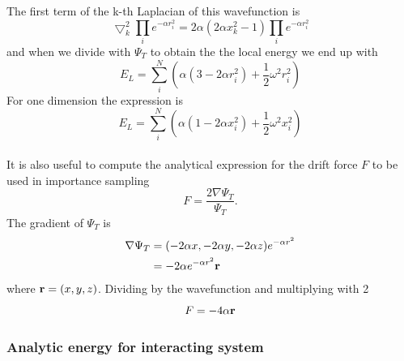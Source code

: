 \documentclass[english, a4paper]{article}
\begin{document}
The first term of the k-th Laplacian of this wavefunction is
\begin{equation}
 \bigtriangledown^2_k\prod_i e^{-\alpha r_i^2} = 2\alpha(2\alpha x_k^2 - 1)\prod_i e^{-\alpha r_i^2}
\end{equation}
and when we divide with $\Psi_T$ to obtain the the local energy we end up with
\begin{equation}
 E_L = \sum_i^N \left( \alpha(3 - 2\alpha r_i^2) + \frac{1}{2}\omega^2r_i^2 \right)
\end{equation}
For one dimension the expression is
\begin{equation}
 E_L = \sum_i^N \left( \alpha(1 - 2\alpha x_i^2) + \frac{1}{2}\omega^2x_i^2 \right)
\end{equation} \\

\noindent It is also useful to compute the analytical expression for the drift force $F$ to be used in importance sampling
\begin{equation}
 F = \frac{2\nabla \Psi_T}{\Psi_T}.
\end{equation}
The gradient of $\Psi_T$ is
\begin{align}
 \nabla \Psi_T &= (-2\alpha x, -2\alpha y, -2\alpha z)e^{-\alpha r^2} \\
               &= -2\alpha e^{-\alpha r^2} \bf{r}
\end{align}
where ${\bf r} = (x, y, z)$.
Dividing by the wavefunction and multiplying with 2
\begin{equation}
 F = -4\alpha \bf{r}
\end{equation}


\subsubsection{Analytic energy for interacting system}
\end{document}
